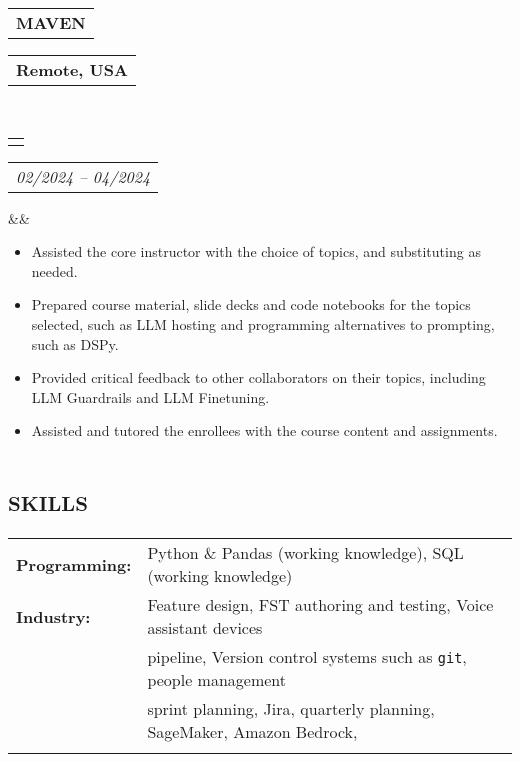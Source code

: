 \documentclass[12pt,letter,roman]{moderncv}        %
\makeatletter
\newcommand*{\customcventry}[7][.25em]{
  \begin{tabular}{@{}l} 
    {\bfseries #4}
  \end{tabular}
  \hfill%
  \begin{tabular}{l@{}}
     {\bfseries #5}
  \end{tabular} \\
  \begin{tabular}{@{}l} 
    {{\color{airforceblue}{\textbf{#3}}}}
  \end{tabular}
  \hfill%
  \begin{tabular}{l@{}}
     {\itshape #2}
  \end{tabular}
  \ifx&#7&%
  \else{\\%
    \begin{minipage}{\maincolumnwidth}%
      \small#7%
    \end{minipage}}\fi%
  \par\addvspace{#1}}
\makeatother
\begin{document}
{{{{{{{\begin{itemize}
  \end{itemize}}
}


\dotfill


{\customcventry{02/2024 -- 04/2024}{Part-time Instructor, Advanced LLM Application Building }{MAVEN}{Remote, USA}
{}{}
{\begin{itemize}

            \item{\small Assisted the core instructor with the choice of topics, and substituting as needed.}
                        \item{\small Prepared course material, slide decks and code notebooks for the topics selected, such as LLM hosting and programming alternatives to prompting, such as DSPy.}
                        \item{\small Provided critical feedback to other collaborators on their topics, including LLM Guardrails and LLM Finetuning.}
                        \item{\small Assisted and tutored the enrollees with the course content and assignments.}



             

        \end{itemize}
        
        }


\vspace{-0.5em}





\section{\LARGE{\textsc{skills}}}


\begin{tabular}{@{}ll}
\textbf{Programming: } & Python \& Pandas (working knowledge), SQL (working knowledge)\\ 

\textbf{Industry: } & Feature design, FST authoring and testing, Voice assistant devices \\ 
\vspace{0.2em}
& pipeline, Version control systems such as {\texttt {git}}, people management\\
& sprint planning, Jira, quarterly planning, SageMaker, Amazon Bedrock,\\
\vspace{0.2em}


\end{tabular}}}}}}}
\end{document}
